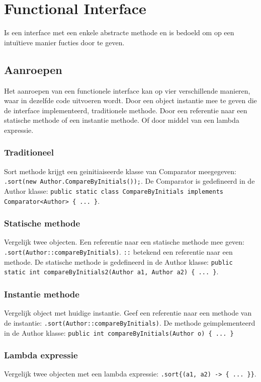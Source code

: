 \section{Functional Interface}
Is een interface met een enkele abstracte methode en is bedoeld om op een intuïtieve manier fucties door te geven.

\subsection{Aanroepen}
Het aanroepen van een functionele interface kan op vier verschillende manieren, waar in dezelfde code uitvoeren wordt.
Door een object instantie mee te geven die de interface implementeerd, traditionele methode.
Door een referentie naar een statische methode of een instantie methode.
Of door middel van een lambda expressie.

\subsubsection{Traditioneel}
Sort methode krijgt een geinitiaiseerde klasse van Comparator meegegeven: \texttt{.sort(new Author.CompareByInitials());}.
De Comparator is gedefineerd in de Author klasse: \texttt{public static class CompareByInitials implements Comparator<Author> \{ ... \}}.

\subsubsection{Statische methode}
Vergelijk twee objecten.
Een referentie naar een statische methode mee geven: \texttt{.sort(Author::compareByInitials)}.
\texttt{::} betekend een referentie naar een methode.
De statische methode is gedefineerd in de Author klasse: \texttt{public static int compareByInitials2(Author a1, Author a2) \{ ... \}}.

\subsubsection{Instantie methode}
Vergelijk object met huidige instantie.
Geef een referentie naar een methode van de instantie: \texttt{.sort(Author::compareByInitials)}.
De methode geimplementeerd in de Author klasse: \texttt{public int compareByInitials(Author o) \{ ... \}}

\subsubsection{Lambda expressie}
Vergelijk twee objecten met een lambda expressie: \texttt{.sort\{(a1, a2) -> \{ ... \}\}}.

